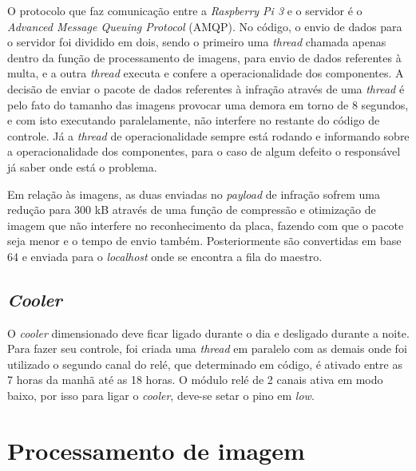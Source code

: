  O protocolo que faz comunicação entre a \emph{Raspberry Pi 3} e o servidor é o \emph{Advanced Message Queuing Protocol} (AMQP). No código, o envio de dados para o servidor foi dividido em dois, sendo o primeiro uma \emph{thread} chamada apenas dentro da função de processamento de imagens, para envio de dados referentes à multa, e a outra \emph{thread} executa e confere a operacionalidade dos componentes. A decisão de enviar o pacote de dados referentes à infração através de uma \emph{thread} é pelo fato do tamanho das imagens provocar uma demora em torno de 8 segundos, e com isto executando paralelamente, não interfere no restante do código de controle. Já a \emph{thread} de operacionalidade sempre está rodando e informando sobre a operacionalidade dos componentes, para o caso de algum defeito o responsável já saber onde está o problema. \par
 Em relação às imagens, as duas enviadas no \emph{payload} de infração sofrem uma redução para 300 kB através de uma função de compressão e otimização de imagem que não interfere no reconhecimento da placa, fazendo com que o pacote seja menor e o tempo de envio também. Posteriormente são convertidas em base 64 e enviada para o \emph{localhost} onde se encontra a fila do maestro.

\subsection{\emph{Cooler}} 
O \emph{cooler} dimensionado deve ficar ligado durante o dia e desligado durante a noite. Para fazer seu controle, foi criada uma \emph{thread} em paralelo com as demais onde foi utilizado o segundo canal do relé, que determinado em código, é ativado entre as 7 horas da manhã até as 18 horas. O módulo relé de 2 canais ativa em modo baixo, por isso para ligar o \emph{cooler}, deve-se setar o pino em \emph{low}.

\section{Processamento de imagem} \label{procimag}

